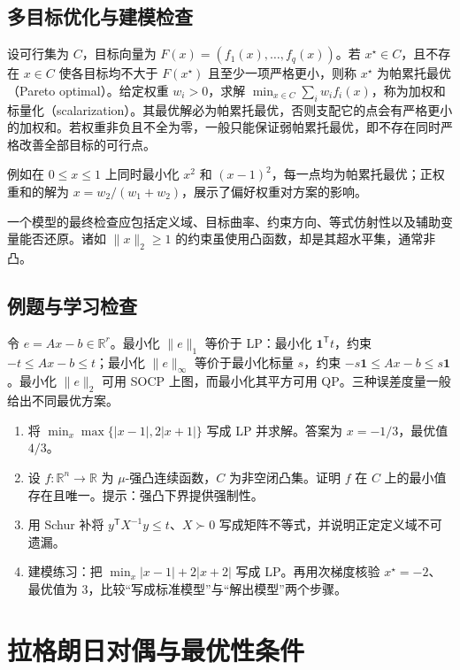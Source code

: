 \documentclass[UTF8,12pt,a4paper,fontset=fandol]{ctexbook}
\begin{document}
\section{多目标优化与建模检查}

设可行集为 $C$，目标向量为 $F(x)=(f_1(x),\ldots,f_q(x))$。若 $x^\star\in C$，且不存在 $x\in C$ 使各目标均不大于 $F(x^\star)$ 且至少一项严格更小，则称 $x^\star$ 为帕累托最优（Pareto optimal）。给定权重 $w_i>0$，求解 $\min_{x\in C}\sum_iw_i f_i(x)$，称为加权和标量化（scalarization）。其最优解必为帕累托最优，否则支配它的点会有严格更小的加权和。若权重非负且不全为零，一般只能保证弱帕累托最优，即不存在同时严格改善全部目标的可行点。

例如在 $0\leq x\leq1$ 上同时最小化 $x^2$ 和 $(x-1)^2$，每一点均为帕累托最优；正权重和的解为 $x=w_2/(w_1+w_2)$，展示了偏好权重对方案的影响。

一个模型的最终检查应包括定义域、目标曲率、约束方向、等式仿射性以及辅助变量能否还原。诸如 $\|x\|_2\geq1$ 的约束虽使用凸函数，却是其超水平集，通常非凸。

\section{例题与学习检查}
\begin{example}[同一残差的不同模型]
令 $e=Ax-b\in\mathbb R^r$。最小化 $\|e\|_1$ 等价于 LP：最小化 $\mathbf1^{\mathsf T}t$，约束 $-t\leq Ax-b\leq t$；最小化 $\|e\|_\infty$ 等价于最小化标量 $s$，约束 $-s\mathbf1\leq Ax-b\leq s\mathbf1$。最小化 $\|e\|_2$ 可用 SOCP 上图，而最小化其平方可用 QP。三种误差度量一般给出不同最优方案。
\end{example}
\begin{enumerate}
 \item 将 $\min_x\max\{|x-1|,2|x+1|\}$ 写成 LP 并求解。答案为 $x=-1/3$，最优值 $4/3$。
 \item 设 $f:\mathbb R^n\to\mathbb R$ 为 $\mu$-强凸连续函数，$C$ 为非空闭凸集。证明 $f$ 在 $C$ 上的最小值存在且唯一。提示：强凸下界提供强制性。
 \item 用 Schur 补将 $y^{\mathsf T}X^{-1}y\leq t$、$X\succ0$ 写成矩阵不等式，并说明正定定义域不可遗漏。
 \item 建模练习：把 $\min_x |x-1|+2|x+2|$ 写成 LP。再用次梯度核验 $x^\star=-2$、最优值为 $3$，比较“写成标准模型”与“解出模型”两个步骤。
\end{enumerate}

\chapter{拉格朗日对偶与最优性条件}
\label{ch:co-duality}
\end{document}
